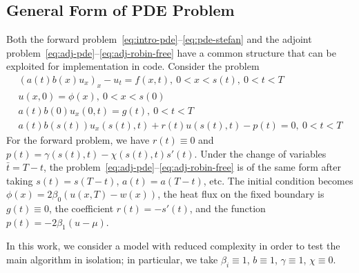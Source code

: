 \documentclass[letterpaper, 10pt]{amsart}
\theoremstyle{definition}
\theoremstyle{remark}
\begin{document}
\subsection{General Form of PDE Problem}
Both the forward problem~\eqref{eq:intro-pde}--\eqref{eq:pde-stefan} and the
adjoint problem~\eqref{eq:adj-pde}--\eqref{eq:adj-robin-free} have a common
structure that can be exploited for implementation in code.
Consider the problem
\begin{gather}
  (a(t) b(x) u_x)_x  - u_t = f(x,t),~0<x<s(t),~0<t<T\label{eq:general-pde}
  \\
  u(x,0) = \phi(x),~0<x<s(0)\label{eq:general-init}
  \\
  a(t)b(0) u_x(0,t) = g(t),~0<t<T\label{eq:general-fixedbdy}
  \\
  a(t)b(s(t)) u_x(s(t),t) + r(t) u(s(t),t) - p(t)=0,~0<t<T\label{eq:general-movingbdy}
\end{gather}
For the forward problem, we have $r(t) \equiv 0$ and $p(t) = \gamma(s(t),t)-\chi(s(t),t)s'(t)$.
Under the change of variables $\bar{t} = T-t$, the
problem~\eqref{eq:adj-pde}--\eqref{eq:adj-robin-free} is of the same form after
taking $s(t) = s(T-t)$, $a(t)=a(T-t)$, etc.\@
The initial condition becomes $\phi(x)=2 \beta_0 (u(x,T) - w(x))$, the heat flux
on the fixed boundary is $g(t)\equiv 0$, the coefficient $r(t) = -s'(t)$, and
the function $p(t) = -2\beta_1 (u - \mu)$.

In this work, we consider a model with reduced complexity in order to test the
main algorithm in isolation; in particular, we take $\beta_i \equiv 1$, $b\equiv
1$, $\gamma \equiv 1$, $\chi \equiv 0$.
\end{document}
